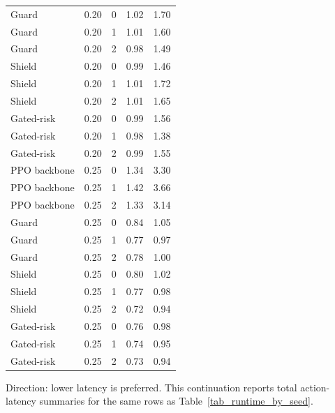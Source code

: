 \begin{table}[!htbp]
\begin{tabular}{@{}lllrr@{}}
Guard & 0.20 & 0 & 1.02 & 1.70 \\
Guard & 0.20 & 1 & 1.01 & 1.60 \\
Guard & 0.20 & 2 & 0.98 & 1.49 \\
Shield & 0.20 & 0 & 0.99 & 1.46 \\
Shield & 0.20 & 1 & 1.01 & 1.72 \\
Shield & 0.20 & 2 & 1.01 & 1.65 \\
Gated-risk & 0.20 & 0 & 0.99 & 1.56 \\
Gated-risk & 0.20 & 1 & 0.98 & 1.38 \\
Gated-risk & 0.20 & 2 & 0.99 & 1.55 \\
PPO backbone & 0.25 & 0 & 1.34 & 3.30 \\
PPO backbone & 0.25 & 1 & 1.42 & 3.66 \\
PPO backbone & 0.25 & 2 & 1.33 & 3.14 \\
Guard & 0.25 & 0 & 0.84 & 1.05 \\
Guard & 0.25 & 1 & 0.77 & 0.97 \\
Guard & 0.25 & 2 & 0.78 & 1.00 \\
Shield & 0.25 & 0 & 0.80 & 1.02 \\
Shield & 0.25 & 1 & 0.77 & 0.98 \\
Shield & 0.25 & 2 & 0.72 & 0.94 \\
Gated-risk & 0.25 & 0 & 0.76 & 0.98 \\
Gated-risk & 0.25 & 1 & 0.74 & 0.95 \\
Gated-risk & 0.25 & 2 & 0.73 & 0.94 \\
\bottomrule
\end{tabular}
\begin{tablenotes}
\item Direction: lower latency is preferred. This continuation reports total action-latency summaries for the same rows as Table~\ref{tab_runtime_by_seed}.
\end{tablenotes}
\end{table}
